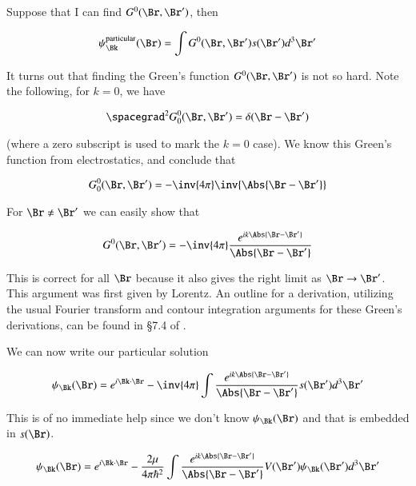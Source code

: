 Suppose that I can find $G^0(\Br, \Br')$, then

\begin{equation}\label{eqn:qmTwoL25:90}
\psi_\Bk^{\text{particular}}(\Br) = \int G^0(\Br, \Br') s(\Br') d^3 \Br'
\end{equation}

It turns out that finding the Green's function $G^0(\Br, \Br')$ is not so hard.  Note the following, for $k = 0$, we have

\begin{equation}\label{eqn:qmTwoL25:110}
\spacegrad^2 G^0_0(\Br, \Br') = \delta(\Br - \Br')
\end{equation}

(where a zero subscript is used to mark the $k = 0$ case).  We know this Green's function from electrostatics, and conclude that 

\begin{equation}\label{eqn:qmTwoL25:130}
G^0_0(\Br, \Br') = - \inv{4 \pi} \inv{\Abs{\Br - \Br'}}
\end{equation}

For $\Br \ne \Br'$ we can easily show that

\begin{equation}\label{eqn:qmTwoL25:150}
G^0(\Br, \Br') = - \inv{4 \pi} \frac{e^{i k\Abs{\Br - \Br'}}}{\Abs{\Br - \Br'}}
\end{equation}

This is correct for all $\Br$ because it also gives the right limit as $\Br \rightarrow \Br'$.  This argument was first given by Lorentz.  An outline for a derivation, utilizing the usual Fourier transform and contour integration arguments for these Green's derivations, can be found in \S 7.4 of \cite{byron1992mca}.

We can now write our particular solution

\begin{equation}\label{eqn:qmTwoL25:170}
\psi_\Bk(\Br) 
= e^{i \Bk \cdot \Br}
- \inv{4 \pi} \int \frac{e^{i k\Abs{\Br - \Br'}}}{\Abs{\Br - \Br'}} s(\Br') d^3 \Br'
\end{equation}

This is of no immediate help since we don't know $\psi_\Bk(\Br)$ and that is embedded in $s(\Br)$.

\begin{equation}\label{eqn:qmTwoL25:190}
\psi_\Bk(\Br) 
= e^{i \Bk \cdot \Br}
- \frac{2 \mu}{4 \pi \hbar^2} \int \frac{e^{i k\Abs{\Br - \Br'}}}{\Abs{\Br - \Br'}} V(\Br') \psi_\Bk(\Br') d^3 \Br'
\end{equation}

